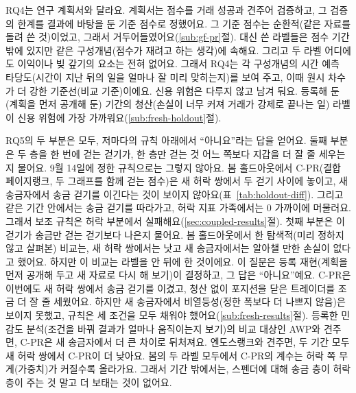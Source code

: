 RQ4는 연구 계획서와 달라요. 계획서는 점수를 거래 성공과 견주어 검증하고, 그 검증의 한계를 결과에 바탕을 둔 기준 점수로 정했어요. 그 기준 점수는 순환적(같은 자료를 돌려 쓴 것)이었고, 그래서 거두어들였어요(\ref{sub:gf-pr}절). 대신 쓴 라벨들은 점수 기간 밖에 있지만 같은 구성개념(점수가 재려고 하는 생각)에 속해요. 그리고 두 라벨 어디에도 이익이나 빚 갚기의 요소는 전혀 없어요. 그래서 RQ4는 각 구성개념의 시간 예측 타당도(시간이 지난 뒤의 일을 얼마나 잘 미리 맞히는지)를 보여 주고, 이때 원시 차수가 더 강한 기준선(비교 기준)이에요. 신용 위험은 다루지 않고 남겨 둬요. 등록해 둔(계획을 먼저 공개해 둔) 기간의 청산(손실이 너무 커져 거래가 강제로 끝나는 일) 라벨이 신용 위험에 가장 가까워요(\ref{sub:fresh-holdout}절).


RQ5의 두 부분은 모두, 저마다의 규칙 아래에서 “아니요”라는 답을 얻어요. 둘째 부분은 두 층을 한 번에 걷는 걷기가, 한 층만 걷는 것 어느 쪽보다 지갑을 더 잘 줄 세우는지 물어요. 9월 14일에 정한 규칙으로는 그렇지 않아요. 봄 홀드아웃에서 C-PR(결합 페이지랭크, 두 그래프를 함께 걷는 점수)은 새 허락 쌍에서 두 걷기 사이에 놓이고, 새 송금자에서 송금 걷기를 이긴다는 것이 보이지 않아요(표~\ref{tab:holdout-diff}). 그리고 같은 기간 안에서는 송금 걷기를 따라가고, 허락 지표 가족에서는 0 가까이에 머물러요. 그래서 보조 규칙은 허락 부분에서 실패해요(\ref{sec:coupled-results}절). 첫째 부분은 이 걷기가 송금만 걷는 걷기보다 나은지 물어요. 봄 홀드아웃에서 한 탐색적(미리 정하지 않고 살펴본) 비교는, 새 허락 쌍에서는 낫고 새 송금자에서는 알아챌 만한 손실이 없다고 했어요. 하지만 이 비교는 라벨을 안 뒤에 한 것이에요. 이 질문은 등록 재현(계획을 먼저 공개해 두고 새 자료로 다시 해 보기)이 결정하고, 그 답은 “아니요”예요. C-PR은 이번에도 새 허락 쌍에서 송금 걷기를 이겼고, 청산 없이 포지션을 닫은 트레이더를 조금 더 잘 줄 세웠어요. 하지만 새 송금자에서 비열등성(정한 폭보다 더 나쁘지 않음)은 보이지 못했고, 규칙은 세 조건을 모두 채워야 했어요(\ref{sub:fresh-results}절). 등록한 민감도 분석(조건을 바꿔 결과가 얼마나 움직이는지 보기)의 비교 대상인 AWP와 견주면, C-PR은 새 송금자에서 더 큰 차이로 뒤처져요. 엔도스랭크와 견주면, 두 기간 모두 새 허락 쌍에서 C-PR이 더 낮아요. 봄의 두 라벨 모두에서 C-PR의 계수는 허락 쪽 무게(가중치)가 커질수록 올라가요. 그래서 기간 밖에서는, 스펜더에 대해 송금 층이 허락 층이 주는 것 말고 더 보태는 것이 없어요.


